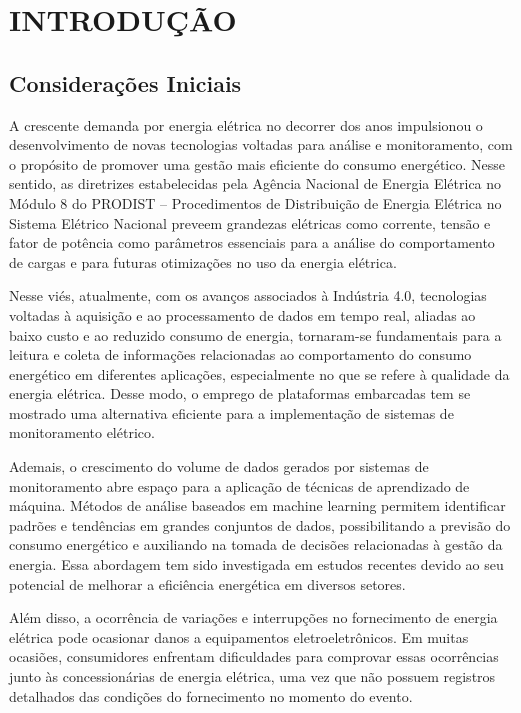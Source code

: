 
\chapter{INTRODUÇÃO}{}
\section{Considerações Iniciais}
A crescente demanda por energia elétrica no decorrer dos anos impulsionou o desenvolvimento de novas tecnologias voltadas para análise e monitoramento, com o propósito de promover uma gestão mais eficiente do consumo energético. Nesse sentido, as diretrizes estabelecidas pela Agência Nacional de Energia Elétrica no Módulo 8 do PRODIST – Procedimentos de Distribuição de Energia Elétrica no Sistema Elétrico Nacional preveem grandezas elétricas como corrente, tensão e fator de potência como parâmetros essenciais para a análise do comportamento de cargas e para futuras otimizações no uso da energia elétrica\cite{ANEEL2021}.

Nesse viés, atualmente, com os avanços associados à Indústria 4.0, tecnologias voltadas à aquisição e ao processamento de dados em tempo real, aliadas ao baixo custo e ao reduzido consumo de energia, tornaram-se fundamentais para a leitura e coleta de informações relacionadas ao comportamento do consumo energético em diferentes aplicações, especialmente no que se refere à qualidade da energia elétrica. Desse modo, o emprego de plataformas embarcadas tem se mostrado uma alternativa eficiente para a implementação de sistemas de monitoramento elétrico\cite{Gilchrist2016}.

Ademais, o crescimento do volume de dados gerados por sistemas de monitoramento abre espaço para a aplicação de técnicas de aprendizado de máquina. Métodos de análise baseados em machine learning permitem identificar padrões e tendências em grandes conjuntos de dados, possibilitando a previsão do consumo energético e auxiliando na tomada de decisões relacionadas à gestão da energia\cite{Bishop2006}. Essa abordagem tem sido investigada em estudos recentes devido ao seu potencial de melhorar a eficiência energética em diversos setores.

Além disso, a ocorrência de variações e interrupções no fornecimento de energia elétrica pode ocasionar danos a equipamentos eletroeletrônicos. Em muitas ocasiões, consumidores enfrentam dificuldades para comprovar essas ocorrências junto às concessionárias de energia elétrica, uma vez que não possuem registros detalhados das condições do fornecimento no momento do evento. 

